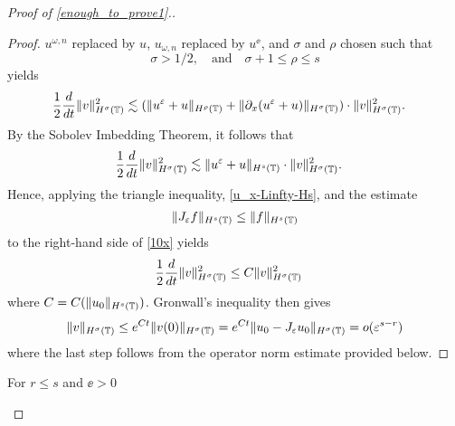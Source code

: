 \begin{proof}[Proof of \eqref{enough_to_prove1}.]
\begin{proof}
$u^{\omega,n}$ replaced by $u$, $u_{\omega,n}$ replaced by $u^\ee$, and
$\sigma$ and $\rho$ chosen such that
%
%
%
\begin{equation*}
\label{size_of_sigma}
 \sigma > 1/2,
 \quad 
 \text{and}
 \quad
 \sigma + 1 \le \rho \le s 
\end{equation*}
%
%
yields
%
%
\begin{equation*}
\begin{split}
\frac{1}{2}\frac{d}{dt} \|v\|_{H^\sigma(\mathbb{T})}^2
& \lesssim
(\|u^{\varepsilon} + u\|_{H^{\rho}(\mathbb{T})} +
\|\partial_x(u^{\varepsilon} + u) \|_{H^\sigma(\mathbb{T})})
\cdot \|v\|_{H^\sigma(\mathbb{T})}^2.
\end{split}
\end{equation*}
%
%
By the Sobolev Imbedding Theorem, it follows that 
%
%
\begin{equation}
\begin{split}
\frac{1}{2}\frac{d}{dt} \|v\|_{H^{\sigma}(\mathbb{T})}^2
& \lesssim
\|u^{\varepsilon}
+ u\|_{H^{s}(\mathbb{T})} \cdot \|v\|_{H^{\sigma}(\mathbb{T})}^2.
\label{10x}
\end{split}
\end{equation}
%
%
Hence, applying the triangle inequality, \eqref{u_x-Linfty-Hs}, and the estimate
%
%
\begin{equation}
\begin{split}
	\|J_\varepsilon f\|_{H^s(\mathbb{T})} \le \|f\|_{H^s(\mathbb{T})}
\label{lem100u}
\end{split}
\end{equation}
%
%
%
%
to the right-hand side of \eqref{10x} yields
%
%
%
%
%
\begin{equation*}
\begin{split}
\label{12x}
\frac{1}{2}\frac{d}{dt} \|v\|_{H^{\sigma}(\mathbb{T})}^2
& \le
C \|v\|_{H^{\sigma}(\mathbb{T})}^2
\end{split}
\end{equation*}
%
%
where $C = C(\|u_0\|_{H^s(\mathbb{T})})$. Gronwall's inequality then gives
%
%
%
\begin{equation*}
\label{conc-lemma}
\begin{split}
\|v\|_{H^{\sigma}(\mathbb{T})}
 \le e^{C t}\|v(0)\|_{H^{\sigma}(\mathbb{T})}
 = e^{C t}\|u_0 - J_\varepsilon u_0 \|_{H^{\sigma}(\mathbb{T})} = o(\varepsilon^{s-r})
\end{split}
\end{equation*}
%
%
%
%
%
where the last step follows from the operator norm estimate provided below. 
\end{proof}
%
%
\begin{lemma}
\label{lem4r}
For $r \le s$ and $\ee>0$
%
%
\begin{equation}

\end{equation}
\end{lemma}
\end{proof}
